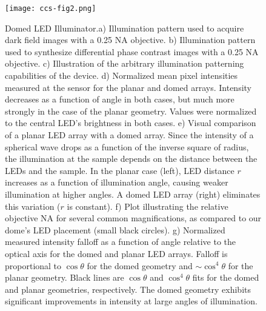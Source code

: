 \begin{figure} [h]
\begin{center}
\texttt{[image: ccs-fig2.png]}
\end{center}
\caption {{ Domed LED Illuminator.}{a)} Illumination pattern used to acquire dark field images with a 0.25 NA objective.
{b)} Illumination pattern used to synthesize differential phase contrast images with a 0.25 NA objective.
{c)} Illustration of the arbitrary illumination patterning capabilities of the device.
{d)} Normalized mean pixel intensities measured at the sensor for the planar and domed arrays. Intensity decreases as a function of angle in both cases, but much more strongly in the case of the planar geometry. Values were normalized to the central LED's brightness in both cases.
{e)} Visual comparison of a planar LED array with a domed array. Since the intensity of a spherical wave drops as a function of the inverse square of radius, the illumination at the sample depends on the distance between the LEDs and the sample. In the planar case (left), LED distance $r$ increases as a function of illumination angle, causing weaker illumination at higher angles. A domed LED array (right) eliminates this variation ($r$ is constant). 
{f)} Plot illustrating the relative objective NA for several common magnifications, as compared to our dome's LED placement (small black circles).
{g)} Normalized measured intensity falloff as a function of angle relative to the optical axis for the domed and planar LED arrays. Falloff is proportional to $\cos{\theta}$ for the domed geometry and $\sim\cos^4{\theta}$ for the planar geometry. Black lines are $\cos{\theta}$ and $\cos^4{\theta}$ fits for the domed and planar geometries, respectively. The domed geometry exhibits significant improvements in intensity at large angles of illumination. 
}
\label{fig:dome} 
\end{figure} 

